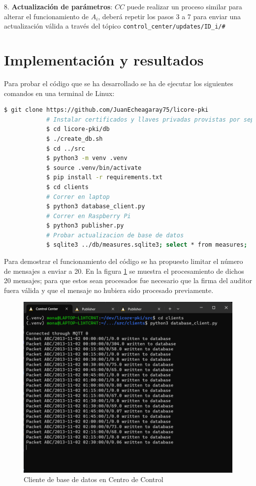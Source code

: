 \documentclass{article}
\begin{document}
            8. \textbf{Actualización de parámetros}: $CC$ puede realizar un proceso similar para alterar el funcionamiento de $A_i$, deberá repetir los pasos 3 a 7 para enviar una actualización válida a través del tópico \texttt{control\_center/updates/ID\_i/\#}

    \section{Implementación y resultados}

        Para probar el código que se ha desarrollado se ha de ejecutar los siguientes comandos en una terminal de Linux:
        \begin{lstlisting}[language=bash]
            $ git clone https://github.com/JuanEcheagaray75/licore-pki
            # Instalar certificados y llaves privadas provistas por separado
            $ cd licore-pki/db
            $ ./create_db.sh
            $ cd ../src
            $ python3 -m venv .venv
            $ source .venv/bin/activate
            $ pip install -r requirements.txt
            $ cd clients
            # Correr en laptop
            $ python3 database_client.py
            # Correr en Raspberry Pi
            $ python3 publisher.py
            # Probar actualizacion de base de datos
            $ sqlite3 ../db/measures.sqlite3; select * from measures;
        \end{lstlisting}

        Para demostrar el funcionamiento del código se ha propuesto limitar el número de mensajes a enviar a 20. En la figura \ref{fig:db_client} se muestra el procesamiento de dichos 20 mensajes; para que estos sean procesados fue necesario que la firma del auditor fuera válida y que el mensaje no hubiera sido procesado previamente.
        \begin{figure}[!htbp]
            \centering
            \includegraphics[scale=0.5]{database_client.png}
            \caption{Cliente de base de datos en Centro de Control}
            \label{fig:db_client}
        \end{figure}
\end{document}
